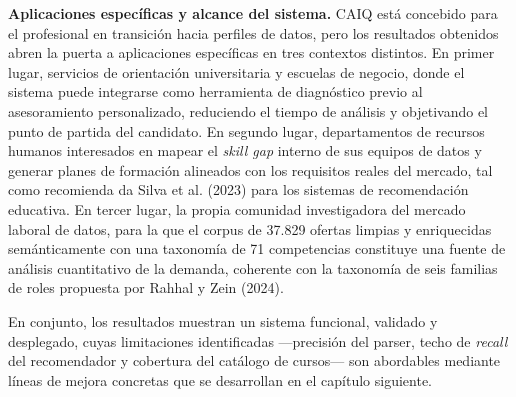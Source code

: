 \textbf{Aplicaciones específicas y alcance del sistema.} CAIQ está concebido para el profesional en transición hacia perfiles de datos, pero los resultados obtenidos abren la puerta a aplicaciones específicas en tres contextos distintos. En primer lugar, servicios de orientación universitaria y escuelas de negocio, donde el sistema puede integrarse como herramienta de diagnóstico previo al asesoramiento personalizado, reduciendo el tiempo de análisis y objetivando el punto de partida del candidato. En segundo lugar, departamentos de recursos humanos interesados en mapear el \textit{skill gap} interno de sus equipos de datos y generar planes de formación alineados con los requisitos reales del mercado, tal como recomienda da Silva et al. (2023) para los sistemas de recomendación educativa. En tercer lugar, la propia comunidad investigadora del mercado laboral de datos, para la que el corpus de 37.829 ofertas limpias y enriquecidas semánticamente con una taxonomía de 71 competencias constituye una fuente de análisis cuantitativo de la demanda, coherente con la taxonomía de seis familias de roles propuesta por Rahhal y Zein (2024).

En conjunto, los resultados muestran un sistema funcional, validado y desplegado, cuyas limitaciones identificadas —precisión del parser, techo de \textit{recall} del recomendador y cobertura del catálogo de cursos— son abordables mediante líneas de mejora concretas que se desarrollan en el capítulo siguiente.
